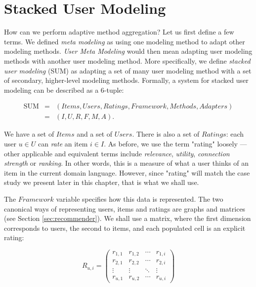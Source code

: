 \section{Stacked User Modeling}
\label{sec:usermetamodeling}

How can we perform adaptive method aggregation?
Let us first define a few terms.
We defined \emph{meta modeling} as using one modeling method to adapt other modeling methods.
\emph{User Meta Modeling} would then mean adapting user modeling methods with another user modeling method.
More specifically, we define \emph{stacked user modeling} (SUM) as adapting a set of many user modeling method
with a set of secondary, higher-level modeling methods.
Formally, a system for stacked user modeling can be described as a 6-tuple:

\begin{eqnarray*}
  \mathrm{SUM} &=& (Items, Users, Ratings, Framework, Methods, Adapters)\\
               &=& (I,U,R,F,M,A).
\end{eqnarray*}

We have a set of $Items$ and a set of $Users$.
There is also a set of $Ratings$: each user $u \in U$ can \emph{rate} an item $i \in I$.
As before, we use the term "rating" loosely --- other applicable and equivalent terms include \emph{relevance}, \emph{utility},
\emph{connection strength} or \emph{ranking}. In other words, this is a measure of what a user thinks of an item
in the current domain language. However, since "rating" will match the case study we present later in this chapter,
that is what we shall use. 

The $Framework$ variable specifies how this data is represented.
The two canonical ways of representing users, items and ratings are graphs and matrices (see Section \ref{sec:recommender}).
We shall use a matrix, where the first dimension corresponds to users, the second to items, and each populated cell is an explicit rating:

\begin{equation*}
 R_{u,i} =
 \begin{pmatrix}
  r_{1,1} & r_{1,2} & \cdots & r_{1,i} \\
  r_{2,1} & r_{2,2} & \cdots & r_{2,i} \\
  \vdots  & \vdots  & \ddots & \vdots  \\
  r_{u,1} & r_{u,2} & \cdots & r_{u,i}
 \end{pmatrix}
\end{equation*}

